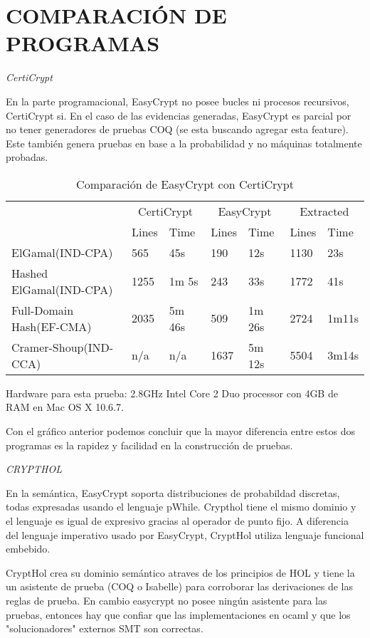 \documentclass[runningheads,a4paper]{llncs}
\begin{document}
\section{COMPARACIÓN DE PROGRAMAS}
\centerline{\emph{CertiCrypt}}

En la parte programacional, EasyCrypt no posee bucles ni procesos recursivos, CertiCrypt si. En el caso de las evidencias generadas, EasyCrypt es parcial por no tener generadores de pruebas COQ (se esta buscando agregar esta feature). Este también genera pruebas en base a la probabilidad y no máquinas totalmente probadas.

\begin{table}
  \caption{Comparación de EasyCrypt con CertiCrypt}
  \label{tab:simple1}
  \centering
  \begin{tabular}{ |p{3.5cm}|p{1.5cm}|p{1.5cm}|p{1.5cm}|p{1.5cm}|p{1.5cm}|p{1.5cm}|  }
 \hline
 & \multicolumn{2}{|c|}{CertiCrypt} & \multicolumn{2}{|c|}{EasyCrypt} & \multicolumn{2}{|c|}{Extracted} \\\cline{2-7}

 &Lines&Time&Lines&Time&Lines&Time\\\cline{2-7}
 \hline
 ElGamal(IND-CPA) & 565 & 45s & 190 & 12s & 1130 & 23s\\
 Hashed ElGamal(IND-CPA) & 1255  & 1m 5s & 243  & 33s & 1772 & 41s\\
 Full-Domain Hash(EF-CMA) & 2035 & 5m 46s&  509 & 1m 26s & 2724 & 1m11s\\
 Cramer-Shoup(IND-CCA) & n/a & n/a & 1637 & 5m 12s & 5504 & 3m14s\\
 \hline
\end{tabular}
\end{table}

Hardware para esta prueba: 2.8GHz Intel Core 2 Duo processor con 4GB de RAM en Mac OS X 10.6.7.\cite{article3}

Con el gráfico anterior podemos concluir que la mayor diferencia entre estos dos programas es la rapidez y facilidad en la construcción de pruebas.

\centerline{\emph{CRYPTHOL}}

En la semántica, EasyCrypt soporta distribuciones de probabildad discretas, todas expresadas usando el lenguaje pWhile. Crypthol tiene el mismo dominio y el lenguaje es igual de expresivo gracias al operador de punto fijo. A diferencia del lenguaje imperativo usado por EasyCrypt, CryptHol utiliza lenguaje funcional embebido.

CryptHol crea su dominio semántico atraves de los principios de HOL y tiene la un asistente de prueba (COQ o Isabelle) para corroborar las derivaciones de las reglas de prueba. En cambio easycrypt no posee ningún asistente para las pruebas, entonces hay que confiar que las implementaciones en ocaml y que los "solucionadores" externos SMT son correctas.
\end{document}
